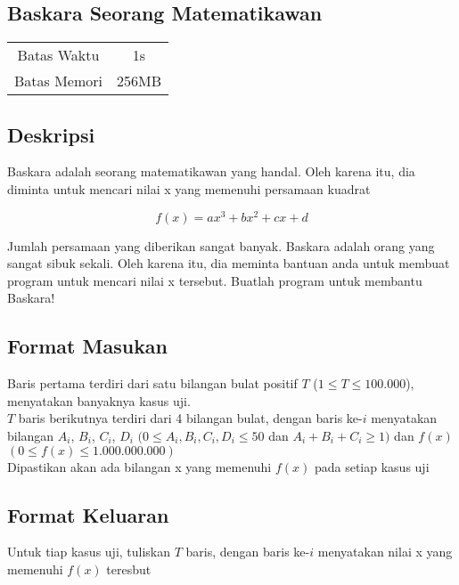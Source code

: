 \documentclass{article}
\begin{document}
\begin{center}

    
    \section*{Baskara Seorang Matematikawan} %

    \begin{tabular}{ | c c | }
        \hline
        Batas Waktu  & 1s \\    %
        Batas Memori & 256MB \\  %
        \hline
    \end{tabular}
\end{center}

\subsection*{Deskripsi}

Baskara adalah seorang matematikawan yang handal. Oleh karena itu, dia diminta untuk mencari nilai x yang memenuhi persamaan kuadrat 

\[ f(x) = ax^3 + bx^2 + cx + d \]

Jumlah persamaan yang diberikan sangat banyak. Baskara adalah orang yang sangat sibuk sekali. Oleh karena itu, dia meminta bantuan anda untuk membuat program untuk mencari nilai x tersebut. Buatlah program untuk membantu Baskara!

\subsection*{Format Masukan}

Baris pertama terdiri dari satu bilangan bulat positif $T$ ($1 \leq T \leq 100.000$), menyatakan banyaknya kasus uji. \\
$T$ baris berikutnya terdiri dari 4 bilangan bulat, dengan baris ke-$i$ menyatakan bilangan $A_i$, $B_i$, $C_i$, $D_i$  $(0 \leq A_i,B_i,C_i,D_i \leq 50 $ dan $ A_i + B_i + C_i \geq 1)$  dan $f(x)$ $(0 \leq f(x) \leq 1.000.000.000 )$\\
Dipastikan akan ada bilangan x yang memenuhi $f(x)$ pada setiap kasus uji

\subsection*{Format Keluaran}

Untuk tiap kasus uji, tuliskan $T$ baris, dengan baris ke-$i$ menyatakan nilai x yang memenuhi $f(x)$ teresbut
\\
\end{document}

